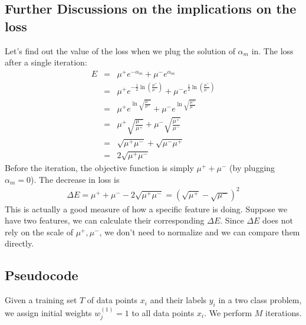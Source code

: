 \documentclass[]{article}  %
\begin{document}
\subsection{Further Discussions on the implications on the loss}
Let's find out the value of the loss when we plug the solution of $\alpha_m$ in. 
The loss after a single iteration:
\begin{eqnarray*}
E &=& \mu^+e^{-\alpha_m} + \mu^-e^{\alpha_m} \\
&=& \mu^+ e^{-\frac{1}{2}\ln\left(\frac{\mu^+}{\mu^-}\right)} + \mu^- e^{\frac{1}{2}\ln\left(\frac{\mu^+}{\mu^-}\right)}\\
&=& \mu^+ e^{\ln{\sqrt{\frac{\mu^-}{\mu^+}}}} + \mu^- e^ {\ln{\sqrt{\frac{\mu^+}{\mu^-}}}}\\
&=& \mu^+ \sqrt{\frac{\mu^-}{\mu^+}} + \mu^- \sqrt{\frac{\mu^+}{\mu^-}} \\
&=& \sqrt{\mu^+\mu^-} + \sqrt{\mu^-\mu^+} \\
&=& 2\sqrt{\mu^+\mu^-} 
\end{eqnarray*}
Before the iteration, the objective function is simply $\mu^+ + \mu^-$ (by plugging $\alpha_m=0$). The decrease in loss is
\begin{eqnarray}
\Delta E = \mu^+ + \mu^-  - 2\sqrt{\mu^+\mu^-} = (\sqrt{\mu^+} - \sqrt{\mu^-})^2
\end{eqnarray}
This is actually a good measure of how a specific feature is doing. Suppose we have two features, we can calculate their corresponding $\Delta E$. Since $\Delta E$ does not rely on the scale of $\mu^+, \mu^-$, we don't need to normalize and we can compare them directly. 

%
%

\subsection{Pseudocode}
Given a training set $T$ of data points $x_i$ and their labels $y_i$ in a two class problem, we assign initial weights $w_j^{(1)}=1$ to all data points $x_i$. We perform $M$ iterations.
\end{document}
